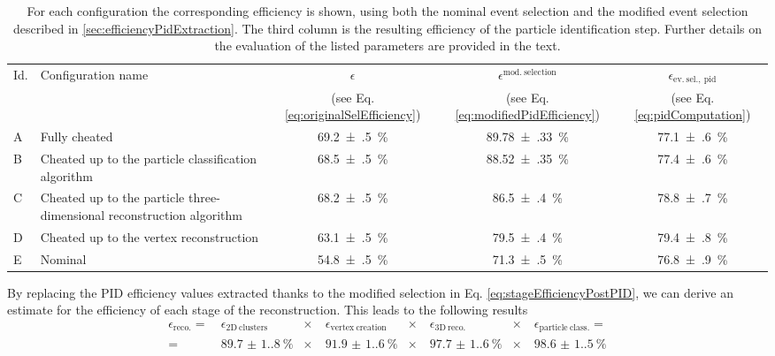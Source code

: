 \begin{table}[]
    \centering
    \caption[Particle identification efficiency for all configurations]{For each configuration the corresponding efficiency is shown, using both the nominal event selection and the modified event selection described in \autoref{sec:efficiencyPidExtraction}. The third column is the resulting efficiency of the particle identification step.  Further details on the evaluation of the listed parameters are provided in the text.}
    \label{tab:pidEfficiencyPerConfiguration}
    \begin{tabular}{lp{4cm}ccc}
        \hline
         Id. & Configuration name & $\epsilon$ & $\epsilon^\mathrm{mod.\ selection}$ & $\epsilon_\mathrm{ev.\ sel.,\ pid}$ \\
         & & (see Eq. \ref{eq:originalSelEfficiency}) & (see Eq. \ref{eq:modifiedPidEfficiency}) & (see Eq. \ref{eq:pidComputation})\\ 
         \hline
         A & Fully cheated & \SI{69.2(5)}{\percent} & \SI{89.78(33)}{\percent} & \SI{77.1(6)}{\percent} \\
         B & Cheated up to the particle classification algorithm & \SI{68.5(5)}{\percent} & \SI{88.52(35)}{\percent} & \SI{77.4(6)}{\percent} \\
         C & Cheated up to the particle three-dimensional reconstruction algorithm & \SI{68.2(5)}{\percent} & \SI{86.5(4)}{\percent} & \SI{78.8(7)}{\percent} \\
         D & Cheated up to the vertex reconstruction & \SI{63.1(5)}{\percent} & \SI{79.5(4)}{\percent} & \SI{79.4(8)}{\percent} \\
         E & Nominal & \SI{54.8(5)}{\percent} & \SI{71.3(5)}{\percent} & \SI{76.8(9)}{\percent} \\
         \hline
    \end{tabular}
\end{table}

By replacing the PID efficiency values extracted thanks to the modified selection in Eq. \eqref{eq:stageEfficiencyPostPID}, we can derive an estimate for the efficiency of each stage of the reconstruction. This leads to the following results \begin{equation}
    \begin{aligned}
        \epsilon_\mathrm{reco.} =&\
        \epsilon_\mathrm{2D\ clusters} &\times&\ 
        \epsilon_\mathrm{vertex\ creation} &\times&\ 
        \epsilon_\mathrm{3D\ reco.} &\times&\ 
        \epsilon_\mathrm{particle\ class.} =\\  
        =&\ \SI{89.7(1.8)}{\percent} &\times&\ 
        \SI{91.9(1.6)}{\percent} &\times&\ 
        \SI{97.7(1.6)}{\percent} &\times&\ 
        \SI{98.6(1.5)}{\percent}
    \end{aligned}\label{eq:results}
\end{equation}

